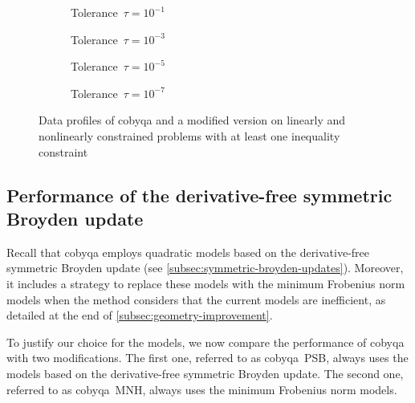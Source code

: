 \begin{figure}[ht]
    \centering
    \begin{subfigure}[b]{0.49\textwidth}
        \centering
        \caption{Tolerance~$\tau = 10^{-1}$}
    \end{subfigure}
    \hfill
    \begin{subfigure}[b]{0.49\textwidth}
        \centering
        \caption{Tolerance~$\tau = 10^{-3}$}
    \end{subfigure}
    \begin{subfigure}[b]{0.49\textwidth}
        \centering
        \caption{Tolerance~$\tau = 10^{-5}$}
    \end{subfigure}
    \hfill
    \begin{subfigure}[b]{0.49\textwidth}
        \centering
        \caption{Tolerance~$\tau = 10^{-7}$}
    \end{subfigure}
    \caption[Data profiles of our new Byrd-Omojokun approach]{Data profiles of \gls{cobyqa} and a modified version on linearly and nonlinearly constrained problems with at least one inequality constraint}
    \label{fig:data-byrd-omojokun}
\end{figure}

\subsection{Performance of the derivative-free symmetric Broyden update}
\label{subsec:alternative-models}

Recall that \gls{cobyqa} employs quadratic models based on the derivative-free symmetric Broyden update (see \cref{subsec:symmetric-broyden-updates}).
Moreover, it includes a strategy to replace these models with the minimum Frobenius norm models when the method considers that the current models are inefficient, as detailed at the end of \cref{subsec:geometry-improvement}.

To justify our choice for the models, we now compare the performance of \gls{cobyqa} with two modifications.
The first one, referred to as \gls{cobyqa}~PSB, always uses the models based on the derivative-free symmetric Broyden update.
The second one, referred to as \gls{cobyqa}~MNH, always uses the minimum Frobenius norm models.

